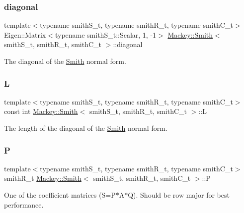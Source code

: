\subsubsection{\texorpdfstring{diagonal}{diagonal}}
{\footnotesize\ttfamily template$<$typename smith\+S\+\_\+t, typename smith\+R\+\_\+t, typename smith\+C\+\_\+t$>$ \\
Eigen\+::\+Matrix$<$typename smith\+S\+\_\+t\+::\+Scalar, 1, -\/1$>$ \hyperlink{classMackey_1_1Smith}{Mackey\+::\+Smith}$<$ smith\+S\+\_\+t, smith\+R\+\_\+t, smith\+C\+\_\+t $>$\+::diagonal}



The diagonal of the \hyperlink{classMackey_1_1Smith}{Smith} normal form. 

\mbox{\label{classMackey_1_1Smith_a02ea735836a4a70f504e360495b0e1e1}} 
\subsubsection{\texorpdfstring{L}{L}}
{\footnotesize\ttfamily template$<$typename smith\+S\+\_\+t, typename smith\+R\+\_\+t, typename smith\+C\+\_\+t$>$ \\
const int \hyperlink{classMackey_1_1Smith}{Mackey\+::\+Smith}$<$ smith\+S\+\_\+t, smith\+R\+\_\+t, smith\+C\+\_\+t $>$\+::L}



The length of the diagonal of the \hyperlink{classMackey_1_1Smith}{Smith} normal form. 

\mbox{\label{classMackey_1_1Smith_a5a831316edd85dedc7394b39fda103a2}} 
\subsubsection{\texorpdfstring{P}{P}}
{\footnotesize\ttfamily template$<$typename smith\+S\+\_\+t, typename smith\+R\+\_\+t, typename smith\+C\+\_\+t$>$ \\
smith\+R\+\_\+t \hyperlink{classMackey_1_1Smith}{Mackey\+::\+Smith}$<$ smith\+S\+\_\+t, smith\+R\+\_\+t, smith\+C\+\_\+t $>$\+::P}



One of the coefficient matrices (S=P$\ast$\+A$\ast$Q). Should be row major for best performance. 


